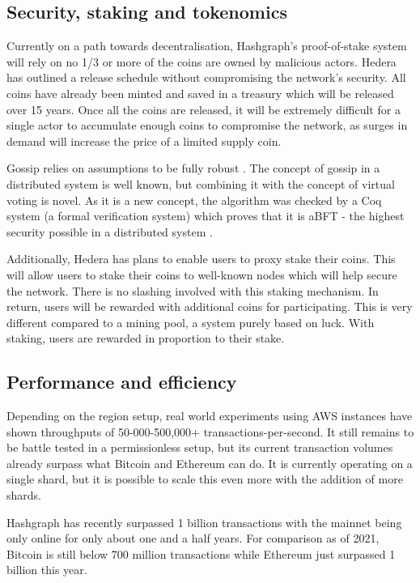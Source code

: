 \subsection{Security, staking and tokenomics}
Currently on a path towards decentralisation, Hashgraph's proof-of-stake system will rely on no 1/3 or more of the coins are owned by malicious actors. Hedera has outlined a release schedule without compromising the network's security. All coins have already been minted and saved in a treasury which will be released over 15 years\cite{economics2020hedera}. Once all the coins are released, it will be extremely difficult for a single actor to accumulate enough coins to compromise the network, as surges in demand will increase the price of a limited supply coin.

Gossip relies on assumptions to be fully robust \cite{alvisi}. The concept of gossip in a distributed system is well known, but combining it with the concept of virtual voting is novel. As it is a new concept, the algorithm was checked by a Coq system (a formal verification system) which proves that it is aBFT - the highest security possible in a distributed system \cite{coq2018}.

Additionally, Hedera has plans to enable users to proxy stake their coins. This will allow users to stake their coins to well-known nodes which will help secure the network\cite{madsen2019hedera}. There is no slashing involved with this staking mechanism. In return, users will be rewarded with additional coins for participating. This is very different compared to a mining pool, a system purely based on luck. With staking, users are rewarded in proportion to their stake.


\subsection{Performance and efficiency}

Depending on the region setup, real world experiments using AWS instances have shown throughputs of 50-000-500,000+ transactions-per-second\cite{baird2018hedera}. It still remains to be battle tested in a permissionless setup, but its current transaction volumes\cite{hederadashboard} already surpass what Bitcoin and Ethereum can do. It is currently operating on a single shard, but it is possible to scale this even more with the addition of more shards.

Hashgraph has recently surpassed 1 billion transactions with the mainnet being only online for only about one and a half years\cite{kunz2021hedera}. For comparison as of 2021, Bitcoin\cite{btctxn} is still below 700 million transactions while Ethereum\cite{ethtxn} just surpassed 1 billion this year.

